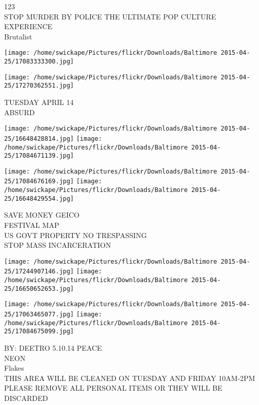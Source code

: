 \documentclass[10pt,letterpaper]{article}
\begin{document}
123\\
STOP MURDER BY POLICE THE ULTIMATE POP CULTURE EXPERIENCE\\
Brutalist
\pagebreak

\texttt{[image: /home/swickape/Pictures/flickr/Downloads/Baltimore 2015-04-25/17083333300.jpg]}

\vspace{0.25in}
\texttt{[image: /home/swickape/Pictures/flickr/Downloads/Baltimore 2015-04-25/17270362551.jpg]}

TUESDAY APRIL 14\\
ABSURD
\pagebreak

\texttt{[image: /home/swickape/Pictures/flickr/Downloads/Baltimore 2015-04-25/16648428814.jpg]}
\texttt{[image: /home/swickape/Pictures/flickr/Downloads/Baltimore 2015-04-25/17084671139.jpg]}

\texttt{[image: /home/swickape/Pictures/flickr/Downloads/Baltimore 2015-04-25/17084676169.jpg]}
\texttt{[image: /home/swickape/Pictures/flickr/Downloads/Baltimore 2015-04-25/16648429554.jpg]}

SAVE MONEY GEICO\\
FESTIVAL MAP\\
US GOVT PROPERTY NO TRESPASSING\\
STOP MASS INCARCERATION
\pagebreak

\texttt{[image: /home/swickape/Pictures/flickr/Downloads/Baltimore 2015-04-25/17244907146.jpg]}
\texttt{[image: /home/swickape/Pictures/flickr/Downloads/Baltimore 2015-04-25/16650652653.jpg]}

\texttt{[image: /home/swickape/Pictures/flickr/Downloads/Baltimore 2015-04-25/17063465077.jpg]}
\texttt{[image: /home/swickape/Pictures/flickr/Downloads/Baltimore 2015-04-25/17084675099.jpg]}

BY: DEETRO 5.10.14 PEACE\\
NEON\\
Flakes\\
THIS AREA WILL BE CLEANED ON TUESDAY AND FRIDAY 10AM{-}2PM PLEASE REMOVE ALL PERSONAL ITEMS OR THEY WILL BE DISCARDED
\pagebreak
\end{document}
